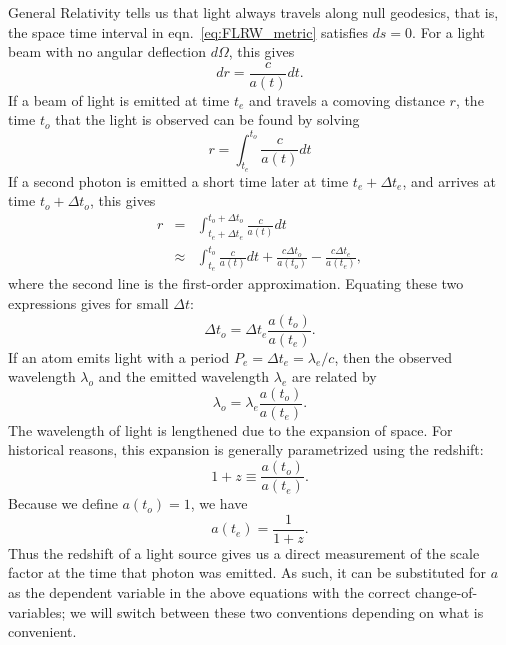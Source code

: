 General Relativity tells us
that light always travels along null geodesics, that is, the space time
interval in eqn.~\ref{eq:FLRW_metric} satisfies $ds = 0$.  For a light
beam with no angular deflection $d\Omega$, this gives
\begin{equation}
  dr = \frac{c}{a(t)} dt.
\end{equation}
If a beam of light is emitted at time $t_e$ and travels
a comoving distance $r$, the
time $t_o$ that the light is observed can be found by solving
\begin{equation}
  r = \int_{t_e}^{t_o} \frac{c}{a(t)} dt
\end{equation}
If a second photon is emitted a short time later at time $t_e + \Delta t_e$,
and arrives at time $t_o + \Delta t_o$, this gives
\begin{eqnarray}
  r &=& 
  \int_{t_e + \Delta t_e}^{t_o + \Delta t_o} \frac{c}{a(t)} dt \nonumber\\
  &\approx& \int_{t_e}^{t_o} \frac{c}{a(t)} dt + \frac{c\Delta t_o}{a(t_o)}
  - \frac{c\Delta t_e}{a(t_e)},
\end{eqnarray}
where the second line is the first-order approximation.  Equating these
two expressions gives for small $\Delta t$:
\begin{equation}
  \label{eq:time_dialation}
  \Delta t_o = \Delta t_e \frac{a(t_o)}{a(t_e)}.
\end{equation}
If an atom emits light with a period 
$P_e = \Delta t_e = \lambda_e / c$, then the observed wavelength $\lambda_o$
and the emitted wavelength $\lambda_e$ are related by
\begin{equation}
  \lambda_o = \lambda_e \frac{a(t_o)}{a(t_e)}.
\end{equation}
The wavelength of light is lengthened due to the expansion of space.  For
historical reasons, this expansion is generally parametrized using the
redshift:
\begin{equation}
  1 + z \equiv \frac{a(t_o)}{a(t_e)}.
\end{equation}
Because we define $a(t_o) = 1$, we have
\begin{equation}
  a(t_e) = \frac{1}{1 + z}.
\end{equation}
Thus the redshift of a light source gives us a direct measurement of the
scale factor at the time that photon was emitted.  As such, it can be
substituted for $a$ as the dependent variable in the above equations
with the correct change-of-variables; we will switch between these two
conventions depending on what is convenient.


